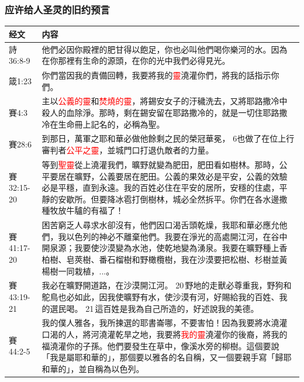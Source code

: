\subsubsection{应许给人圣灵的旧约预言}
\begin{table}[H]
\centering
\begin{tabular}{p{4em}|p{44em}}  \toprule
经文&内容 \\  \midrule

詩36:8-9&他們必因你殿裡的肥甘得以飽足，你也必叫他們喝你樂河的水。因為在你那裡有生命的源頭，在你的光中我們必得見光。\\  \midrule

箴1:23&你們當因我的責備回轉，我要將我的\textcolor{red}{靈}澆灌你們，將我的話指示你們。\\  \midrule

賽4:3&主以\textcolor{red}{公義的靈}和\textcolor{red}{焚燒的靈}，將錫安女子的汙穢洗去，又將耶路撒冷中殺人的血除淨。那時，剩在錫安留在耶路撒冷的，就是一切住耶路撒冷在生命冊上記名的，必稱為聖。\\  \midrule
賽28:6&到那日，萬軍之耶和華必做他餘剩之民的榮冠華冕， 6也做了在位上行審判者\textcolor{red}{公平之靈}，並城門口打退仇敵者的力量。\\  \midrule

賽32:15-20&等到\textcolor{red}{聖靈}從上澆灌我們，曠野就變為肥田，肥田看如樹林。那時，公平要居在曠野，公義要居在肥田。公義的果效必是平安，公義的效驗必是平穩，直到永遠。我的百姓必住在平安的居所，安穩的住處，平靜的安歇所。但要降冰雹打倒樹林，城必全然拆平。你們在各水邊撒種牧放牛驢的有福了！\\  \midrule


賽41:17-20&困苦窮乏人尋求水卻沒有，他們因口渴舌頭乾燥，我耶和華必應允他們，我以色列的神必不離棄他們。我要在淨光的高處開江河，在谷中開泉源；我要使沙漠變為水池，使乾地變為湧泉。我要在曠野種上香柏樹、皂莢樹、番石榴樹和野橄欖樹，我在沙漠要把松樹、杉樹並黃楊樹一同栽植，...。\\  \midrule


賽43:19-21&我必在曠野開道路，在沙漠開江河。 20 野地的走獸必尊重我，野狗和鴕鳥也必如此，因我使曠野有水，使沙漠有河，好賜給我的百姓、我的選民喝。 21 這百姓是我為自己所造的，好述說我的美德。\\  \midrule

賽44:2-5&我的僕人雅各，我所揀選的耶書崙哪，不要害怕！因為我要將水澆灌口渴的人，將河澆灌乾旱之地，我要將\textcolor{red}{我的靈}澆灌你的後裔，將我的福澆灌你的子孫。他們要發生在草中，像溪水旁的柳樹。這個要說「我是屬耶和華的」，那個要以雅各的名自稱，又一個要親手寫「歸耶和華的」，並自稱為以色列。\\  \midrule


\end{tabular}
\end{table}
